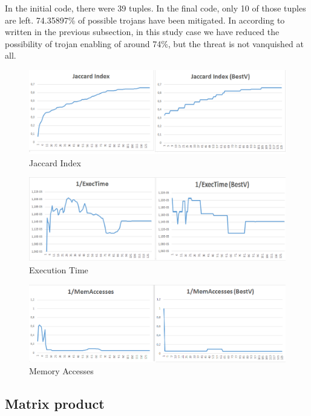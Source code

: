 \documentclass[a4paper,twoside]{article}
\theoremstyle{definition}
\theoremstyle{remark}
\begin{document}
In the initial code, there were 39 tuples.
In the final code, only 10 of those tuples are left.
74.35897\% of possible trojans have been mitigated. In according to written in the previous subsection, in this study case we have reduced the possibility of trojan enabling of around 74\%, but the threat is not vanquished at all. 

\newpage

\begin{figure}[H]
\includegraphics[scale=0.6]{Immagini/05}
\caption{Jaccard Index}
\end{figure}

\begin{figure}[H]
\raggedright
\includegraphics[scale=0.6]{Immagini/06}
\caption{Execution Time}
\end{figure}

\begin{figure}[H]
\raggedright
\includegraphics[scale=0.6]{Immagini/07}
\caption{Memory Accesses}
\end{figure}

\newpage

\subsection{Matrix product}
\end{document}
